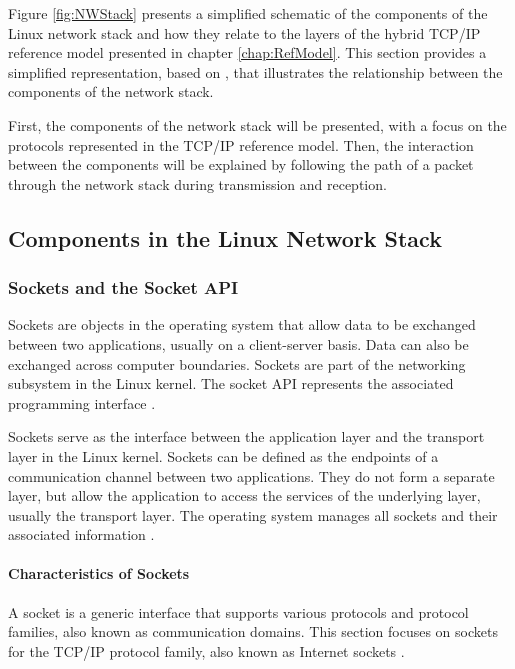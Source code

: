Figure \ref{fig:NWStack} presents a simplified schematic of the components of the Linux network stack and how they relate to the layers of the hybrid TCP/IP reference model presented in chapter \ref{chap:RefModel}. This section provides a simplified representation, based on \cite{lins06}, that illustrates the relationship between the components of the network stack. 

First, the components of the network stack will be presented, with a focus on the protocols represented in the TCP/IP reference model. Then, the interaction between the components will be explained by following the path of a packet through the network stack during transmission and reception.


\subsection{Components in the Linux Network Stack}

\subsubsection{Sockets and the Socket API}

Sockets are objects in the operating system that allow data to be exchanged between two applications, usually on a client-server basis. Data can also be exchanged across computer boundaries. Sockets are part of the networking subsystem in the Linux kernel. The socket API represents the associated programming interface \cite{sock01}\cite{sock11}.

Sockets serve as the interface between the application layer and the transport layer in the Linux kernel. Sockets can be defined as the endpoints of a communication channel between two applications. They do not form a separate layer, but allow the application to access the services of the underlying layer, usually the transport layer. The operating system manages all sockets and their associated information \cite{sock02}.

\paragraph{Characteristics of Sockets}

A socket is a generic interface that supports various protocols and protocol families, also known as communication domains. This section focuses on sockets for the TCP/IP protocol family, also known as Internet sockets \cite{like03}.


